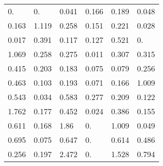 \begin{tabular}{|llllll|}
\color[HTML]{909090}0. & \color[HTML]{909090}0. & \color[HTML]{808080}0.041 & \color[HTML]{606060}0.166 & \color[HTML]{505050}0.189 & \color[HTML]{808080}0.048 \\ 
\color[HTML]{606060}0.163 & \color[HTML]{000000}1.119 & \color[HTML]{404040}0.258 & \color[HTML]{606060}0.151 & \color[HTML]{505050}0.221 & \color[HTML]{808080}0.028 \\ 
\color[HTML]{909090}0.017 & \color[HTML]{101010}0.391 & \color[HTML]{707070}0.117 & \color[HTML]{606060}0.127 & \color[HTML]{000000}0.521 & \color[HTML]{909090}0. \\ 
\color[HTML]{000000}1.069 & \color[HTML]{404040}0.258 & \color[HTML]{303030}0.275 & \color[HTML]{909090}0.011 & \color[HTML]{303030}0.307 & \color[HTML]{303030}0.315 \\ 
\color[HTML]{101010}0.415 & \color[HTML]{505050}0.203 & \color[HTML]{505050}0.183 & \color[HTML]{707070}0.075 & \color[HTML]{707070}0.079 & \color[HTML]{404040}0.256 \\ 
\color[HTML]{000000}0.463 & \color[HTML]{707070}0.103 & \color[HTML]{505050}0.193 & \color[HTML]{808080}0.071 & \color[HTML]{606060}0.166 & \color[HTML]{000000}1.009 \\ 
\color[HTML]{000000}0.543 & \color[HTML]{808080}0.034 & \color[HTML]{000000}0.583 & \color[HTML]{303030}0.277 & \color[HTML]{505050}0.209 & \color[HTML]{707070}0.122 \\ 
\color[HTML]{000000}1.762 & \color[HTML]{505050}0.177 & \color[HTML]{000000}0.452 & \color[HTML]{909090}0.024 & \color[HTML]{101010}0.386 & \color[HTML]{606060}0.155 \\ 
\color[HTML]{000000}0.611 & \color[HTML]{606060}0.168 & \color[HTML]{000000}1.86 & \color[HTML]{909090}0. & \color[HTML]{000000}1.009 & \color[HTML]{808080}0.049 \\ 
\color[HTML]{000000}0.695 & \color[HTML]{707070}0.075 & \color[HTML]{000000}0.647 & \color[HTML]{909090}0. & \color[HTML]{000000}0.614 & \color[HTML]{000000}0.486 \\ 
\color[HTML]{404040}0.256 & \color[HTML]{505050}0.197 & \color[HTML]{000000}2.472 & \color[HTML]{909090}0. & \color[HTML]{000000}1.528 & \color[HTML]{000000}0.794
\end{tabular}
